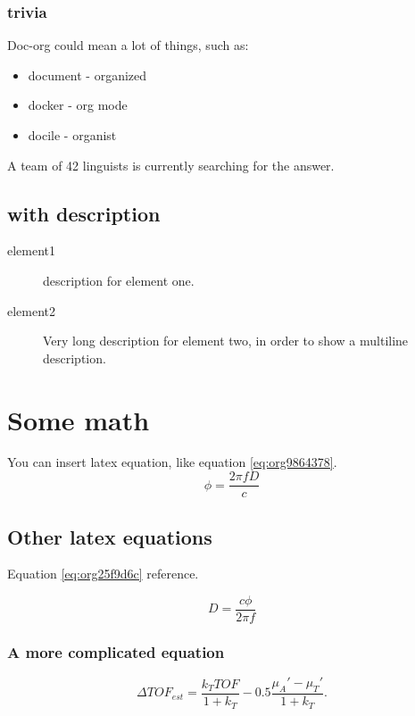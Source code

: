 \documentclass[11pt]{article}
\begin{document}
\subsubsection{trivia}
\label{sec:org57639dd}
Doc-org could mean a lot of things, such as:
\begin{itemize}
\item document - organized
\item docker - org mode
\item docile - organist
\end{itemize}
A team of 42 linguists is currently searching for the answer.
\subsection{with description}
\label{sec:org887e654}
\begin{description}
\item[{element1}] description for element one.
\item[{element2}] Very long description for element two, in order to show a
multiline description.
\end{description}

\section{Some math}
\label{sec:orge2cc5f4}
You can insert latex equation, like equation \ref{eq:org9864378}.
\begin{equation}
\label{eq:org9864378}
\phi = \frac{2\pi fD}{c}
\end{equation}
\subsection{Other latex equations}
\label{sec:orgc1076ac}
Equation \ref{eq:org25f9d6c} reference.

\begin{equation}
\label{eq:org25f9d6c}
D = \frac{c\phi}{2\pi f}
\end{equation}

\subsubsection{A more complicated equation}
\label{sec:orge07e459}

\begin{equation}
\Delta TOF_{est} = \frac{k_T TOF}{1+k_T } - 0.5 \frac{\mu_A' - \mu_T'}{1+k_T}.
\end{equation}
\end{document}
